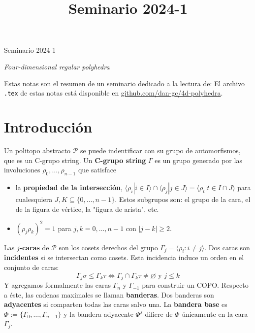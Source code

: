 \documentclass[spanish]{article}
\title{Seminario 2024-1}
\theoremstyle{definition}
\newcommand{\p}{\mathcal{P}}
\begin{document}
	\begin{center}
	{\LARGE Seminario 2024-1
		\vspace{.2cm}
		
		 \textit{Four-dimensional regular polyhedra}}
\end{center}
		\vspace{.2cm}
		
		Estas notas son el resumen de un seminario dedicado a la lectura de:
\printbibliography[heading=none]
		\vspace{.2cm}
El archivo \texttt{.tex} de estas notas está disponible en \href{https://github.com/dan-gc/geo-riem/blob/main/geo-riem.pdf}{github.com/dan-gc/4d-polyhedra}.

\tableofcontents


\section{Introducción}
Un politopo abstracto $\p$ se puede indentificar con su grupo de automorfismos, que es un C-grupo string.
Un \textbf{C-grupo string} $\Gamma$ es un grupo generado por las involuciones $\rho_0,\ldots,\rho_{n-1}$ que satisface
\begin{itemize}
	\item la \textbf{propiedad de la intersección},
	$\langle \rho_i|i\in I\rangle\cap\langle\rho_j|j\in J\rangle=\langle\rho_t|t\in I\cap J\rangle$ para cualesquiera $J,K\subseteq\{0,\ldots,n-1\}$. Estos subgrupos son: el grupo de la cara, el de la figura de vértice, la "figura de arista", etc.
	\item $(\rho_j\rho_k)^2=1$ para $j,k=0,\ldots,n-1$ con $|j-k|\geq2$.
\end{itemize}
Las $j$\textbf{-caras} de $\p$ son los cosets derechos del grupo $\Gamma_j=\langle \rho_i:i\neq j\rangle$. Dos caras son \textbf{incidentes} si se intersectan como cosets. Esta incidencia induce un orden en el conjunto de caras:
\[\Gamma_j\sigma\leq\Gamma_k\tau\iff\Gamma_j\cap\Gamma_k\tau\neq\varnothing\text{ y }j\leq k\]
Y agregamos formalmente las caras $\Gamma_n$ y $\Gamma_{-1}$ para construir un COPO. Respecto a éste, las cadenas maximales se llaman \textbf{banderas}. Dos banderas son \textbf{adyacentes} si comparten todas las caras salvo una. La \textbf{bandera base} es $\Phi:=\{\Gamma_0,\dots,\Gamma_{n-1}\}$ y la bandera adyacente $\Phi^j$ difiere de $\Phi$ únicamente en la cara $\Gamma_j$.
\end{document}
